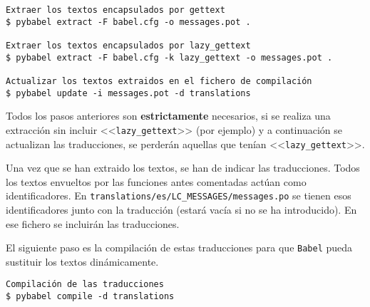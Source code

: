 \begin{tcolorbox}[colback=cyan!5!white,colframe=cyan!75!black,fontupper=\footnotesize,title=Proceso de internacionalización (desde \texttt{/web/app})]
\begin{verbatim}
Extraer los textos encapsulados por gettext
$ pybabel extract -F babel.cfg -o messages.pot .

Extraer los textos encapsulados por lazy_gettext
$ pybabel extract -F babel.cfg -k lazy_gettext -o messages.pot .

Actualizar los textos extraidos en el fichero de compilación
$ pybabel update -i messages.pot -d translations
\end{verbatim}
\end{tcolorbox}

Todos los pasos anteriores son \textbf{estrictamente} necesarios, si se realiza
una extracción sin incluir <<\texttt{lazy\_gettext}>> (por ejemplo) y a
continuación se actualizan las traducciones, se perderán aquellas que tenían
<<\texttt{lazy\_gettext}>>.

Una vez que se han extraido los textos, se han de indicar las traducciones.
Todos los textos envueltos por las funciones antes comentadas actúan como
identificadores. En \texttt{translations/es/LC\_MESSAGES/messages.po} se tienen
esos identificadores junto con la traducción (estará vacía si no se ha
introducido). En ese fichero se incluirán las traducciones.

El siguiente paso es la compilación de estas traducciones para que \texttt{Babel} pueda sustituir
los textos dinámicamente.

\begin{tcolorbox}[colback=cyan!5!white,colframe=cyan!75!black,fontupper=\footnotesize,title=Compilación de traducciones (desde \texttt{/web/app})]
\begin{verbatim}
Compilación de las traducciones
$ pybabel compile -d translations 
\end{verbatim}
\end{tcolorbox}